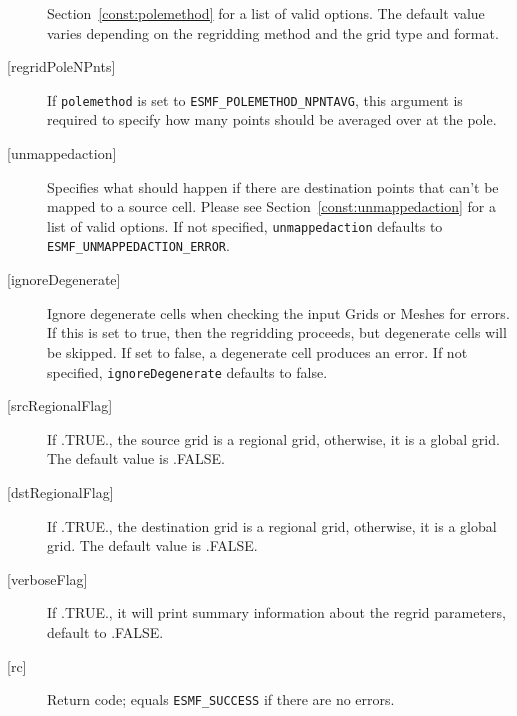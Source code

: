 \begin{description}
       Section~\ref{const:polemethod} for a list of valid options.
       The default value varies depending on the regridding method and the grid type and format.
     \item [{[regridPoleNPnts]}]
       If {\tt polemethod} is set to {\tt ESMF\_POLEMETHOD\_NPNTAVG}, this argument is required to
       specify how many points should be averaged over at the pole.
     \item [{[unmappedaction]}]
             Specifies what should happen if there are destination points that
             can't be mapped to a source cell. Please see Section~\ref{const:unmappedaction} for a
             list of valid options. If not specified, {\tt unmappedaction} defaults to {\tt ESMF\_UNMAPPEDACTION\_ERROR}.
     \item [{[ignoreDegenerate]}]
             Ignore degenerate cells when checking the input Grids or Meshes for errors. If this is set to true, then the
             regridding proceeds, but degenerate cells will be skipped. If set to false, a degenerate cell produces an error.
             If not specified, {\tt ignoreDegenerate} defaults to false.
     \item [{[srcRegionalFlag]}]
       If .TRUE., the source grid is a regional grid, otherwise,
       it is a global grid.  The default value is .FALSE.
     \item [{[dstRegionalFlag]}]
       If .TRUE., the destination grid is a regional grid, otherwise,
       it is a global grid.  The default value is .FALSE.
     \item [{[verboseFlag]}]
       If .TRUE., it will print summary information about the regrid parameters,
       default to .FALSE.
     \item [{[rc]}]
       Return code; equals {\tt ESMF\_SUCCESS} if there are no errors.
     \end{description}
\setlength{\parskip}{\oldparskip}
\setlength{\parindent}{\oldparindent}
\setlength{\baselineskip}{\oldbaselineskip}
